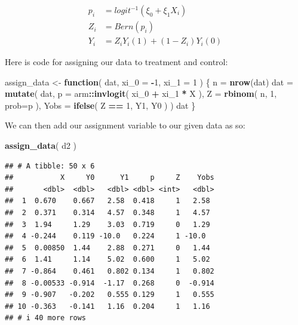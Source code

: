\documentclass[
]{book}
\newenvironment{Shaded}{\begin{snugshade}}{\end{snugshade}}
\newcommand{\AttributeTok}[1]{\textcolor[rgb]{0.13,0.29,0.53}{#1}}
\newcommand{\ControlFlowTok}[1]{\textcolor[rgb]{0.13,0.29,0.53}{\textbf{#1}}}
\newcommand{\DecValTok}[1]{\textcolor[rgb]{0.00,0.00,0.81}{#1}}
\newcommand{\FunctionTok}[1]{\textcolor[rgb]{0.13,0.29,0.53}{\textbf{#1}}}
\newcommand{\NormalTok}[1]{#1}
\newcommand{\OtherTok}[1]{\textcolor[rgb]{0.56,0.35,0.01}{#1}}
\newcommand{\SpecialCharTok}[1]{\textcolor[rgb]{0.81,0.36,0.00}{\textbf{#1}}}
\begin{document}
\[
\begin{aligned}
p_i &= logit^{-1}( \xi_0 + \xi_1 X_i ) \\
Z_i &= Bern( p_i ) \\
Y_i &= Z_i Y_i(1) + (1-Z_i) Y_i(0) 
\end{aligned}
\]

Here is code for assigning our data to treatment and control:

\begin{Shaded}
\begin{Highlighting}[]
\NormalTok{assign\_data }\OtherTok{\textless{}{-}} \ControlFlowTok{function}\NormalTok{( dat,}
                         \AttributeTok{xi\_0 =} \SpecialCharTok{{-}}\DecValTok{1}\NormalTok{, }\AttributeTok{xi\_1 =} \DecValTok{1}\NormalTok{ ) \{}
\NormalTok{  n }\OtherTok{=} \FunctionTok{nrow}\NormalTok{(dat)}
\NormalTok{  dat }\OtherTok{=} \FunctionTok{mutate}\NormalTok{( dat,}
                \AttributeTok{p =}\NormalTok{ arm}\SpecialCharTok{::}\FunctionTok{invlogit}\NormalTok{( xi\_0 }\SpecialCharTok{+}\NormalTok{ xi\_1 }\SpecialCharTok{*}\NormalTok{ X ),}
                \AttributeTok{Z =} \FunctionTok{rbinom}\NormalTok{( n, }\DecValTok{1}\NormalTok{, }\AttributeTok{prob=}\NormalTok{p ),}
                \AttributeTok{Yobs =} \FunctionTok{ifelse}\NormalTok{( Z }\SpecialCharTok{==} \DecValTok{1}\NormalTok{, Y1, Y0 ) )}
\NormalTok{  dat}
\NormalTok{\}}
\end{Highlighting}
\end{Shaded}

We can then add our assignment variable to our given data as so:

\begin{Shaded}
\begin{Highlighting}[]
\FunctionTok{assign\_data}\NormalTok{( d2 )}
\end{Highlighting}
\end{Shaded}

\begin{verbatim}
## # A tibble: 50 x 6
##           X     Y0      Y1     p     Z    Yobs
##       <dbl>  <dbl>   <dbl> <dbl> <int>   <dbl>
##  1  0.670    0.667   2.58  0.418     1   2.58 
##  2  0.371    0.314   4.57  0.348     1   4.57 
##  3  1.94     1.29    3.03  0.719     0   1.29 
##  4 -0.244    0.119 -10.0   0.224     1 -10.0  
##  5  0.00850  1.44    2.88  0.271     0   1.44 
##  6  1.41     1.14    5.02  0.600     1   5.02 
##  7 -0.864    0.461   0.802 0.134     1   0.802
##  8 -0.00533 -0.914  -1.17  0.268     0  -0.914
##  9 -0.907   -0.202   0.555 0.129     1   0.555
## 10 -0.363   -0.141   1.16  0.204     1   1.16 
## # i 40 more rows
\end{verbatim}
\end{document}
